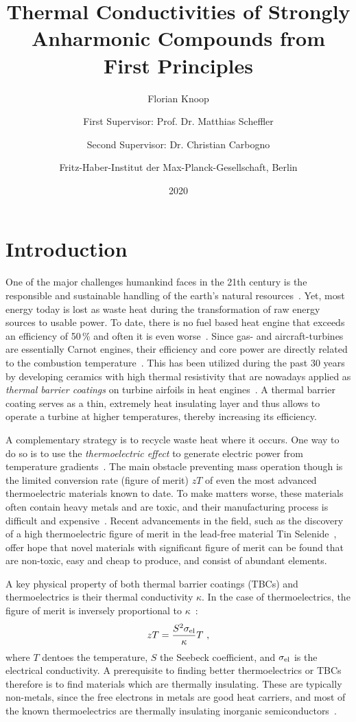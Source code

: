 \documentclass[a4paper,12pt]{book}
\title{
    Thermal Conductivities of Strongly Anharmonic Compounds from First Principles
}
\author{
    Florian Knoop
    \\ \and
    First Supervisor: Prof. Dr. Matthias Scheffler
    \and
    Second Supervisor: Dr. Christian Carbogno
    \\ \and
    Fritz-Haber-Institut der Max-Planck-Gesellschaft, Berlin
}
\date{2020}
\begin{document}
\maketitle

\chapter{Introduction}
One of the major challenges humankind faces in the 21th century is the responsible and sustainable handling of the earth's natural resources~\cite{Schottky1929}.  Yet, most energy today is lost as waste heat during the transformation of raw energy sources to usable power. To date, there is no fuel based heat engine that exceeds an efficiency of 50\,\% and often it is even worse~\cite{eia}. 
Since gas- and aircraft-turbines are essentially Carnot engines, their efficiency and core power are directly related to the combustion temperature~\cite{Clarke2012,Perepezko2009}. This has been utilized during the past 30 years by developing 
ceramics with high thermal resistivity that are nowadays applied as \emph{thermal barrier coatings} on turbine airfoils in heat engines~\cite{Clarke2003}. A thermal barrier coating serves as a thin, extremely heat insulating layer and thus allows to operate a turbine at higher temperatures, thereby increasing its efficiency.

A complementary strategy is to recycle waste heat where it occurs. One way to do so is to use the
\emph{thermoelectric effect} to  generate electric power from temperature gradients~\cite{Snyder2008}. The main obstacle preventing mass operation though is the limited conversion rate (figure of merit) $zT$ of even the most advanced thermoelectric materials known to date. To make matters worse, these materials often contain heavy metals and are toxic, and their manufacturing process is difficult and expensive~\cite{Nolas2001}. Recent advancements in the field, such as the discovery of a high thermoelectric figure of merit in the lead-free material Tin Selenide~\cite{Zhao2014}, offer hope that novel materials with significant figure of merit can be found that are non-toxic, easy and cheap to produce, and consist of abundant elements.

A key physical property of both thermal barrier coatings (TBCs) and thermoelectrics is their thermal conductivity $\kappa$. In the case of thermoelectrics, the figure of merit is inversely proportional to $\kappa$~\cite{Nolas2001}:
\begin{align}
	zT = \frac{S^2 \sigma_{\rm el}}{\kappa} T~,
	\label{eq:zT}
\end{align} 
where $T$ dentoes the temperature, $S$ the Seebeck coefficient, and $\sigma_{\rm el}$ is the electrical conductivity.
A prerequisite to finding better thermoelectrics or TBCs therefore is to find materials which are thermally insulating. These are typically non-metals, since the free electrons in metals are good heat carriers, and most of the known thermoelectrics are thermally insulating inorganic semiconductors~\cite[p.\,15]{Nolas2001}.
\end{document}
